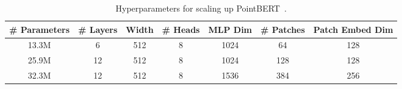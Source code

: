 \documentclass{article} \usepackage{iclr2024_conference,times}
\begin{document}
\begin{table}[h]
\centering
\caption{Hyperparameters for scaling up PointBERT~\citep{point-bert}.}
\label{tab:pbertscl}
\begin{tabular}{ccccccc}
\toprule
\# Parameters & \# Layers & Width & \# Heads & MLP Dim & \# Patches & Patch Embed Dim  \\ 
\midrule
13.3M         & 6         & 512   & 8        & 1024    & 64         & 128                  \\
25.9M         & 12         & 512   & 8        & 1024    & 128         & 128                  \\
32.3M         & 12        & 512   & 8        & 1536    & 384        & 256                  \\
\bottomrule
\end{tabular}
\end{table}
\end{document}
